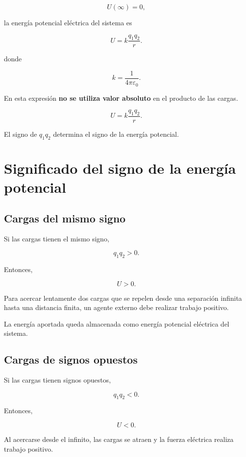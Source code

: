 \[
U(\infty)=0,
\]

la energía potencial eléctrica del sistema es

\begin{equation}
\boxed{
U=k\frac{q_1q_2}{r}
}.
\label{eq:energia_potencial_dos_cargas}
\end{equation}

donde

\[
k=\frac{1}{4\pi\varepsilon_0}.
\]

\begin{advertencia}

En esta expresión \textbf{no se utiliza valor absoluto} en el producto de las cargas.

\[
U=k\frac{q_1q_2}{r}.
\]

El signo de \(q_1q_2\) determina el signo de la energía potencial.

\end{advertencia}


\section{Significado del signo de la energía potencial}

\subsection{Cargas del mismo signo}

Si las cargas tienen el mismo signo,

\[
q_1q_2>0.
\]

Entonces,

\[
\boxed{U>0}.
\]

Para acercar lentamente dos cargas que se repelen desde una separación infinita hasta
una distancia finita, un agente externo debe realizar trabajo positivo.

La energía aportada queda almacenada como energía potencial eléctrica del sistema.


\subsection{Cargas de signos opuestos}

Si las cargas tienen signos opuestos,

\[
q_1q_2<0.
\]

Entonces,

\[
\boxed{U<0}.
\]

Al acercarse desde el infinito, las cargas se atraen y la fuerza eléctrica realiza
trabajo positivo.

